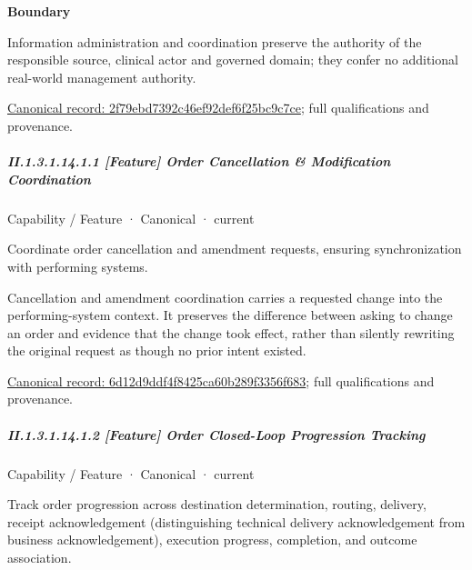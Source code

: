 \textbf{Boundary}



Information administration and coordination preserve the authority of the responsible source, clinical actor and governed domain; they confer no additional real-world management authority.


{\footnotesize \href{../../../../continuum/strategy/capability/2f79ebd7392c46ef92def6f25bc9c7ce.md}{Canonical record: 2f79ebd7392c46ef92def6f25bc9c7ce}; full qualifications and provenance.}\par
\subparagraph*{II.1.3.1.14.1.1 [Feature] Order Cancellation \& Modification Coordination}
\label{navigation:II.1.3.1.14.1.1}

\label{element:6d12d9ddf4f8425ca60b289f3356f683}
{\small Capability / Feature · Canonical · current}\par

Coordinate order cancellation and amendment requests, ensuring synchronization with performing systems.



Cancellation and amendment coordination carries a requested change into the performing-system context. It preserves the difference between asking to change an order and evidence that the change took effect, rather than silently rewriting the original request as though no prior intent existed.


{\footnotesize \href{../../../../continuum/strategy/capability/feature/6d12d9ddf4f8425ca60b289f3356f683.md}{Canonical record: 6d12d9ddf4f8425ca60b289f3356f683}; full qualifications and provenance.}\par
\subparagraph*{II.1.3.1.14.1.2 [Feature] Order Closed-Loop Progression Tracking}
\label{navigation:II.1.3.1.14.1.2}

\label{element:9e63463942b94a6ba3bc045a04d3580b}
{\small Capability / Feature · Canonical · current}\par

Track order progression across destination determination, routing, delivery, receipt acknowledgement (distinguishing technical delivery acknowledgement from business acknowledgement), execution progress, completion, and outcome association.



